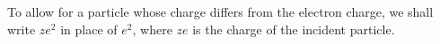 To allow for a particle whose charge differs from the electron charge, we shall write $ze^2$ in place of $e^2$, where $ze$ is the charge of the incident particle.

